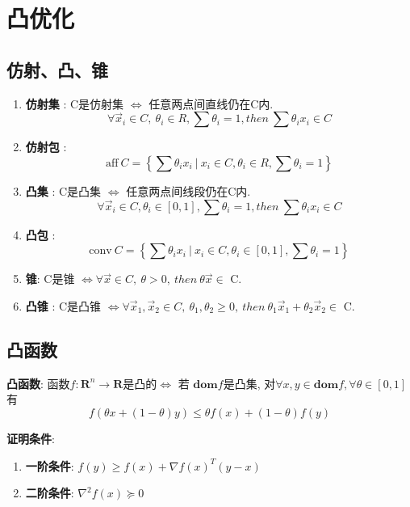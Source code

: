 \documentclass{article}
\title{}\date{} \setlength{\parindent}{0pt} \linespread{1.25}
\begin{document}
\tableofcontents

\section{凸优化}
    \subsection{仿射、凸、锥}
        \begin{enumerate}
            \item \textbf{仿射集} : C是仿射集 $\Leftrightarrow$ 任意两点间直线仍在C内.
                $$\forall \vec x_i \in C,\ \theta_i \in R, \sum \theta_i = 1 , then\ \sum \theta_i x_i \in C $$
            \item \textbf{仿射包} : 
                $$ \text{aff}\ C = \left \{\sum \theta_i x_i\ |\ x_i\in C,\theta_i \in R, \sum \theta_i = 1 \right\}$$
            \item \textbf{凸集} : C是凸集 $\Leftrightarrow$ 任意两点间线段仍在C内.
                $$\forall \vec x_i \in C, \theta_i \in [0,1], \sum \theta_i = 1 , then\ \sum \theta_i x_i \in C $$
            \item \textbf{凸包} : $$ \text{conv}\ C = \left \{\sum \theta_i x_i\ |\ x_i\in C, \theta_i \in [0,1], \sum \theta_i = 1\right \}$$
            \item \textbf{锥}: C是锥 $\Leftrightarrow \forall \vec x \in C,\ \theta > 0,\ then\ \theta \vec x \in$ C.
            \item \textbf{凸锥} : C是凸锥 $\Leftrightarrow \forall \vec x_1, \vec x_2 \in C,\ \theta_1,\theta_2 \ge 0,\ then\ \theta_1 \vec x_1 + \theta_2 \vec x_2 \in$ C.
        \end{enumerate}
        
    \subsection{凸函数}
        \textbf{凸函数}: 函数$f: \mathbf{R}^n \to \mathbf{R}$是凸的$\Leftrightarrow$ 若 $\mathbf{dom} f$是凸集, 对$\forall x,y \in \mathbf{dom} f, \forall \theta \in [0,1]$有
            $$f(\theta x + (1 - \theta) y) \leqslant \theta f(x) + (1 - \theta)f(y)$$
            
        \textbf{证明条件}:
        \begin{enumerate}
            \item \textbf{一阶条件}: $f(y) \geqslant f(x)+\nabla f(x)^{T}(y-x)$
            \item \textbf{二阶条件}: $\nabla^{2} f(x) \succeq 0$
        \end{enumerate}
        
\end{document}
